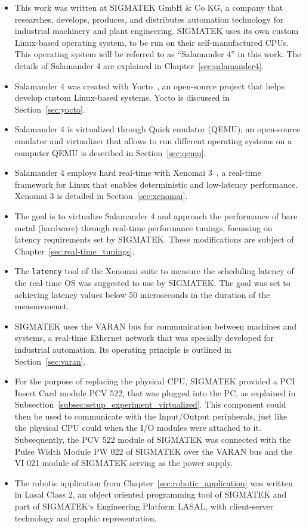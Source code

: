 \documentclass[MMR,Master,english]{twbook}
\begin{document}
\begin{itemize}
	\item This work was written at SIGMATEK GmbH \& Co KG, a company that researches, develops, produces, and distributes automation technology for industrial machinery and plant engineering. SIGMATEK uses its own custom Linux-based operating system, to be run on their self-manufactured CPUs. This operating system will be referred to as ``Salamander 4'' in this work. The details of Salamander 4 are explained in Chapter~\ref{sec:salamander4}.
	\item Salamander 4 was created with Yocto~\cite{WelcomeYoctoProject}, an open-source project that helps develop custom Linux-based systems. Yocto is discussed in Section~\ref{sec:yocto}.
	\item Salamander 4 is virtualized through Quick emulator (QEMU), an open-source emulator and virtualizer that allows to run different operating systems on a computer QEMU is described in Section~\ref{sec:qemu}.
	\item Salamander 4 employs hard real-time with Xenomai 3~\cite{XenomaiXenomai}, a real-time framework for Linux that enables deterministic and low-latency performance. Xenomai 3 is detailed in Section~\ref{sec:xenomai}.
	\item The goal is to virtualize Salamander 4 and approach the performance of bare metal (hardware) through real-time performance tunings, focussing on latency requirements set by SIGMATEK.
	      These modifications are subject of Chapter~\ref{sec:real-time_tunings}.
	\item The \texttt{latency} tool of the Xenomai suite to measure the scheduling latency of the real-time OS was suggested to use by SIGMATEK. The goal was set to achieving latency values below 50 microseconds in the duration of the measuremenet.
	\item SIGMATEK uses the VARAN bus for communication between machines and systems, a real-time Ethernet network that was specially developed for industrial automation. Its operating principle is outlined in Section~\ref{sec:varan}.
	\item For the purpose of replacing the physical CPU, SIGMATEK provided a PCI Insert Card module PCV 522, that was plugged into the PC, as explained in Subsection~\ref{subsec:setup_experiment_virtualized}. This component could then be used to communicate with the Input/Output peripherals, just like the physical CPU could when the I/O modules were attached to it. Subsequently, the PCV 522 module of SIGMATEK was connected with the Pulse Width Module PW 022 of SIGMATEK over the VARAN bus and the VI 021 module of SIGMATEK serving as the power supply.
	\item The robotic application from Chapter~\ref{sec:robotic_application} was written in Lasal Class 2, an object oriented programming tool of SIGMATEK and part of SIGMATEK`s Engineering Platform LASAL, with client-server technology and graphic representation.
\end{itemize}
\end{document}
